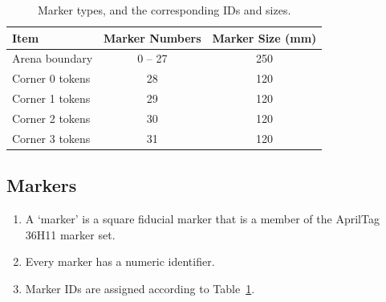 \begin{table}[t]
      \centering
      \begin{tabular}{lcc}
            \toprule
            \textbf{Item} & \textbf{Marker Numbers} & \textbf{Marker Size (mm)} \\
            \midrule
            Arena boundary & {} 0 -- 27 & 250 \\
            Corner 0 tokens & 28 & 120 \\
            Corner 1 tokens & 29 & 120 \\
            Corner 2 tokens & 30 & 120 \\
            Corner 3 tokens & 31 & 120 \\
            \bottomrule
      \end{tabular}
      \caption{Marker types, and the corresponding IDs and sizes.}
      \label{tab:markers}
\end{table}

\subsection{Markers}
\label{spec:marker}

\begin{enumerate}
  \item A `marker' is a square fiducial marker that is a member of the AprilTag 36H11 marker set.
  \item Every marker has a numeric identifier.
  \item Marker IDs are assigned according to Table~\ref{tab:markers}.
\end{enumerate}
